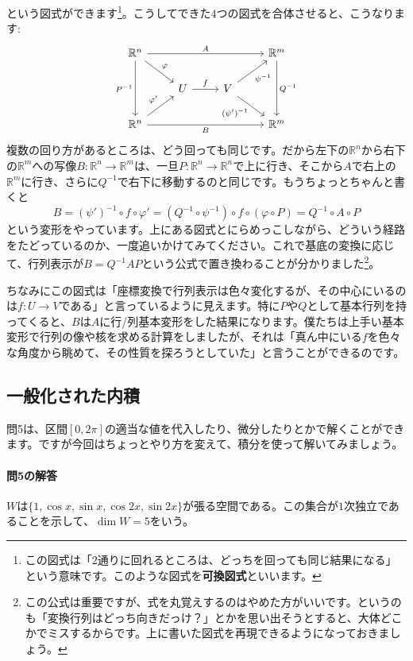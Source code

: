 という図式ができます\footnote{この図式は「$2$通りに回れるところは、どっちを回っても同じ結果になる」という意味です。このような図式を\textbf{可換図式}といいます。}。こうしてできた$4$つの図式を合体させると、こうなります: 
\[
\begin{tikzcd}
\mathbb{R}^n \arrow{rrr}{A}\arrow{rd}{\varphi} \arrow{dd}[swap]{P^{-1}} & & & \mathbb{R}^m \arrow{dd}{Q^{-1}} \\
& U \arrow{r}{f} & V \arrow{ru}[swap]{\psi^{-1}} \arrow{rd}[swap]{(\psi')^{-1}} & \\
\mathbb{R}^n \arrow{rrr}[swap]{B} \arrow{ru}{\varphi'} & & & \mathbb{R}^m
\end{tikzcd}
\]
複数の回り方があるところは、どう回っても同じです。だから左下の$\mathbb{R}^n$から右下の$\mathbb{R}^m$への写像$B\colon\mathbb{R}^n\rightarrow\mathbb{R}^m$は、一旦$P\colon\mathbb{R}^n\rightarrow\mathbb{R}^n$で上に行き、そこから$A$で右上の$\mathbb{R}^m$に行き、さらに$Q^{-1}$で右下に移動するのと同じです。もうちょっとちゃんと書くと
\[
B = (\psi')^{-1}\circ f \circ \varphi' = (Q^{-1}\circ\psi^{-1})\circ f\circ (\varphi\circ P) = Q^{-1}\circ A \circ P
\]
という変形をやっています。上にある図式とにらめっこしながら、どういう経路をたどっているのか、一度追いかけてみてください。これで基底の変換に応じて、行列表示が$B = Q^{-1} A P$という公式で置き換わることが分かりました\footnote{この公式は重要ですが、式を丸覚えするのはやめた方がいいです。というのも「変換行列はどっち向きだっけ？」とかを思い出そうとすると、大体どこかでミスするからです。上に書いた図式を再現できるようになっておきましょう。}。

ちなみにこの図式は「座標変換で行列表示は色々変化するが、その中心にいるのは$f\colon U\rightarrow V$である」と言っているように見えます。特に$P$や$Q$として基本行列を持ってくると、$B$は$A$に行/列基本変形をした結果になります。僕たちは上手い基本変形で行列の像や核を求める計算をしましたが、それは「真ん中にいる$f$を色々な角度から眺めて、その性質を探ろうとしていた」と言うことができるのです。

\subsection{一般化された内積}

問5は、区間$[0, 2\pi]$の適当な値を代入したり、微分したりとかで解くことができます。ですが今回はちょっとやり方を変えて、積分を使って解いてみましょう。

\paragraph{問5の解答} $W$は$\{1, \cos x, \sin x, \cos 2x, \sin 2x\}$が張る空間である。この集合が$1$次独立であることを示して、$\dim W = 5$をいう。

